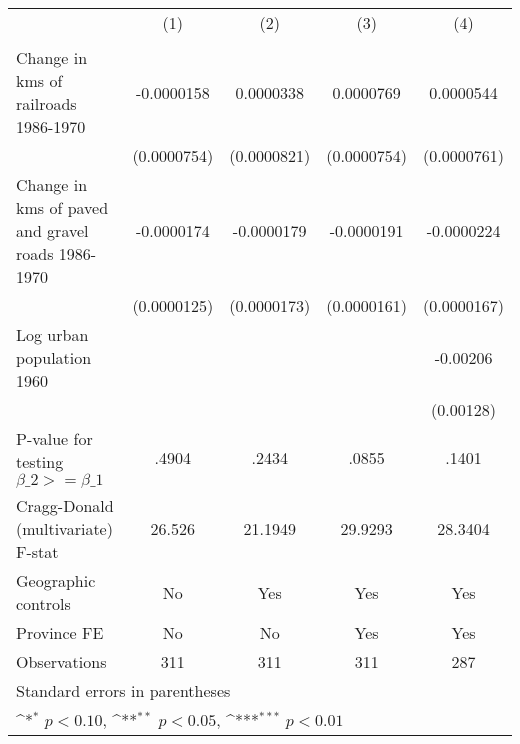 {
\def\sym#1{\ifmmode^{#1}\else\(^{#1}\)\fi}
\begin{tabular}{l*{4}{c}}
\hline\hline
                &\multicolumn{1}{c}{(1)}&\multicolumn{1}{c}{(2)}&\multicolumn{1}{c}{(3)}&\multicolumn{1}{c}{(4)}\\
                &\multicolumn{1}{c}{}&\multicolumn{1}{c}{}&\multicolumn{1}{c}{}&\multicolumn{1}{c}{}\\
\hline
Change in kms of railroads 1986-1970&-0.0000158         &0.0000338         &0.0000769         &0.0000544         \\
                &(0.0000754)         &(0.0000821)         &(0.0000754)         &(0.0000761)         \\
[1em]
Change in kms of paved and gravel roads 1986-1970&-0.0000174         &-0.0000179         &-0.0000191         &-0.0000224         \\
                &(0.0000125)         &(0.0000173)         &(0.0000161)         &(0.0000167)         \\
[1em]
Log urban population 1960&                  &                  &                  & -0.00206         \\
                &                  &                  &                  &(0.00128)         \\
\hline
P-value for testing $\beta\_{2} >= \beta\_{1}$&    .4904         &    .2434         &    .0855         &    .1401         \\
Cragg-Donald (multivariate) F-stat&   26.526         &  21.1949         &  29.9293         &  28.3404         \\
Geographic controls&       No         &      Yes         &      Yes         &      Yes         \\
Province FE     &       No         &       No         &      Yes         &      Yes         \\
Observations    &      311         &      311         &      311         &      287         \\
\hline\hline
\multicolumn{5}{l}{\footnotesize Standard errors in parentheses}\\
\multicolumn{5}{l}{\footnotesize \sym{*} \(p<0.10\), \sym{**} \(p<0.05\), \sym{***} \(p<0.01\)}\\
\end{tabular}
}
